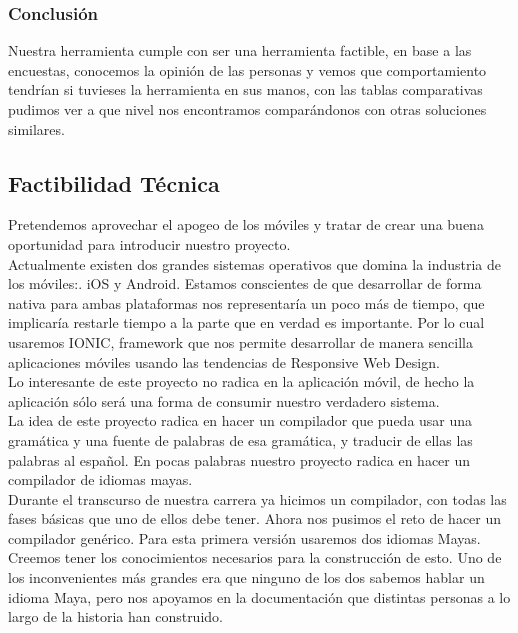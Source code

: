 \documentclass[a4paper,openright,11pt]{article}
\begin{document}
\subsubsection{Conclusión}
Nuestra herramienta cumple con ser una herramienta factible, en base a las encuestas, conocemos la opinión de las personas y vemos que comportamiento tendrían si tuvieses la herramienta en sus manos, con las tablas comparativas pudimos ver a que nivel nos encontramos comparándonos con otras soluciones similares.

\subsection{Factibilidad T\'ecnica}
Pretendemos aprovechar el apogeo de los m\'oviles y tratar de crear una buena oportunidad para introducir nuestro proyecto.\\
Actualmente existen dos grandes sistemas operativos que domina la industria de los m\'oviles:. iOS y Android. Estamos conscientes de que desarrollar de forma nativa para ambas plataformas nos representar\'ia un poco m\'as de tiempo, que implicar\'ia restarle tiempo a la parte que en verdad es importante. Por lo cual usaremos IONIC, framework que nos permite desarrollar de manera sencilla aplicaciones m\'oviles usando las tendencias de Responsive Web Design. \\

Lo interesante de este proyecto no radica en la aplicaci\'on m\'ovil, de hecho la aplicaci\'on s\'olo ser\'a una forma de consumir nuestro verdadero sistema.\\

La idea de este proyecto radica en hacer un compilador que pueda usar una gram\'atica y una fuente de palabras de esa gram\'atica, y traducir de ellas las palabras al español. En pocas palabras nuestro proyecto radica en hacer un compilador de idiomas mayas.\\

Durante el transcurso de nuestra carrera ya hicimos un compilador, con todas las fases b\'asicas que uno de ellos debe tener. Ahora nos pusimos el reto de hacer un compilador gen\'erico. Para esta primera versi\'on usaremos dos idiomas Mayas.\\

Creemos tener los conocimientos necesarios para la construcci\'on de esto. Uno de los inconvenientes m\'as grandes era que ninguno de los dos sabemos hablar un idioma Maya, pero nos apoyamos en la documentaci\'on que distintas personas a lo largo de la historia han construido.\\ 
\end{document}
